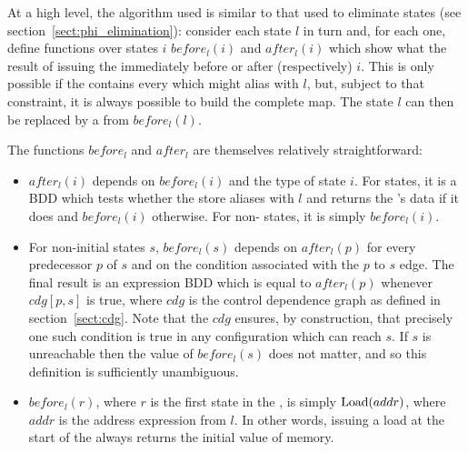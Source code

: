At a high level, the algorithm used is similar to that used to
eliminate \state{$\Phi$} states (see
section~\ref{sect:phi_elimination}): consider each  state
$l$ in turn and, for each one, define functions over states $i$
$before_l(i)$ and $after_l(i)$ which show what the result of issuing
the  immediately before or after (respectively) $i$.  This
is only possible if the {\StateMachine} contains every 
which might alias with $l$, but, subject to that constraint, it is
always possible to build the complete map.  The state $l$ can then be
replaced by a  from $before_l(l)$.

The functions $before_l$ and $after_l$ are themselves relatively
straightforward:

\begin{itemize}
\item $after_l(i)$ depends on $before_l(i)$ and the type of state $i$.
  For  states, it is a BDD which tests whether the store
  aliases with $l$ and returns the 's data if it does and
  $before_l(i)$ otherwise.  For non- states, it is simply
  $before_l(i)$.
\item For non-initial states $s$, $before_l(s)$ depends on
  $after_l(p)$ for every predecessor $p$ of $s$ and on the condition
  associated with the $p$ to $s$ edge.  The final result is an
  expression BDD which is equal to $after_l(p)$ whenever $cdg[p, s]$
  is true, where $cdg$ is the control dependence graph as defined in
  section~\ref{sect:cdg}.    Note that the
  $cdg$ ensures, by construction, that precisely one such condition is
  true in any configuration which can reach
  $s$.  If $s$ is
  unreachable then the value of $before_l(s)$ does not matter, and so
  this definition is sufficiently unambiguous.


\item $before_l(r)$, where $r$ is the first state in the
  {\StateMachine}, is simply $\mathrm{Load}(addr)$, where $addr$ is the
  address expression from $l$.  In other words, issuing a load at the
  start of the {\StateMachine} always returns the initial value of
  memory.
\end{itemize}

